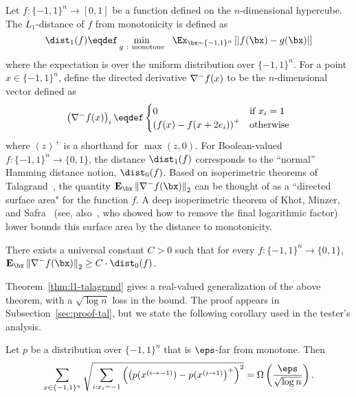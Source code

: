 Let $f:\{-1,1\}^n \to [0,1]$ be a function defined on the $n$-dimensional hypercube. The $L_1$-distance 
of $f$ from monotonicity is defined as
\begin{equation*}
	\dist_1(f) \eqdef \min_{g~:~\text{monotone}} ~~\Ex_{\bx \sim \{-1,1\}^n}\left[ |f(\bx) - g(\bx)| \right]
\end{equation*}
where the expectation is over the uniform distribution over $\{-1,1\}^n$.
For a point $x\in \{-1,1\}^n$, define the directed derivative $\nabla^-f(x)$ to be the $n$-dimensional vector defined as 
\begin{equation}\label{eq:defgrad}
	\left(\grad^-f(x)\right)_i \eqdef \begin{cases}
		0 & \textrm{if $x_i = 1$} \\
		\left(f(x) - f(x+2e_i)\right)^+ & \text{otherwise}
	\end{cases}
\end{equation}
where $(z)^+$ is a shorthand for $\max(z,0)$. For Boolean-valued $f:\{-1,1\}^n \to \{0,1\}$, the distance $\dist_1(f)$ corresponds to the ``normal'' Hamming distance notion, $\dist_0(f)$.
Based on isoperimetric theorems of Talagrand~\cite{Tal93}, the quantity $\Exp_{\bx} \norm{\grad^-f (\bx)}_2$ can be thought
of as a ``directed surface area" for the function $f$. A deep isoperimetric theorem of Khot, Minzer, and Safra~\cite{KMS18} (see, also~\cite{PRW22}, who showed how to remove the final logarithmic factor)
lower bounds this surface area by the distance to monotonicity.

\begin{theorem}\label{thm:booliso}
	There exists a universal constant $C > 0$ such that for every $f \colon \{-1,1\}^n \to \{0,1\}$,
$\Exp_{\bx} \norm{\grad^-f (\bx)}_2 \geq C\cdot \dist_0(f)$.
\end{theorem}

Theorem~\ref{thm:l1-talagrand} gives a real-valued generalization of the above theorem, with a $\sqrt{\log n}$ loss in the bound. The proof appears in Subsection~\ref{sec:proof-tal}, but we state the following corollary used in the tester's analysis.
\begin{corollary} \label{cor:l1-tal} Let $p$ be a distribution over $\{-1,1\}^n$ that is $\eps$-far
from monotone. Then 
\[
\sum_{x \in \{-1,1\}^n} \sqrt{\sum_{i:x_i = -1} \left( \left(p(x^{(i\to-1)}) - p(x^{(i\to1)} \right)^+ \right)^2} = \Omega\left(\frac{\eps}{\sqrt{\log n}}\right).
\]
\end{corollary}

